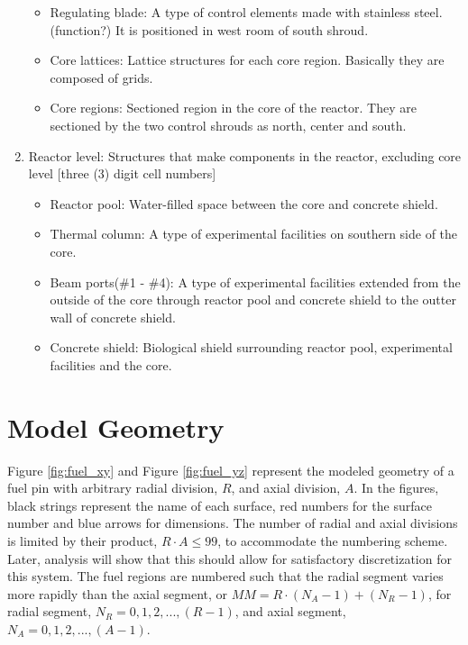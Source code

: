 \documentclass{UWNR_modeling}
\begin{document}
\begin{enumerate}
\begin{itemize}
	\item Regulating blade: A type of control elements made with stainless steel. (function?) It is positioned in west room of south shroud.
	\item Core lattices: Lattice structures for each core region. Basically they are composed of grids.
	\item Core regions: Sectioned region in the core of the reactor. They are sectioned by the two control shrouds as north, center and south.
	\end{itemize}
\item Reactor level: Structures that make components in the reactor, excluding core level [three (3) digit cell numbers]
	\begin{itemize}
	\item Reactor pool: Water-filled space between the core and concrete shield.
	\item Thermal column: A type of experimental facilities on southern side of the core.
	\item Beam ports(\#1 - \#4): A type of experimental facilities extended from the outside of the core through reactor pool and concrete shield to the outter wall of concrete shield.
	\item Concrete shield: Biological shield surrounding reactor pool, experimental facilities and the core.
\end{itemize}
\end{enumerate}

\section{Model Geometry}\label{section:geometry}
Figure \ref{fig:fuel_xy} and Figure \ref{fig:fuel_yz} represent the modeled geometry of a fuel pin with arbitrary radial division, $R$, and axial division, $A$. In the figures, black strings represent the name of each surface, red numbers for the surface number and blue arrows for dimensions.  The number of radial and axial divisions is limited by their product, $R \cdot A \leq 99$, to accommodate the numbering scheme.  Later, analysis will show that this should allow for satisfactory discretization for this system. The fuel regions are numbered such that the radial segment varies more rapidly than the axial segment, or $MM = R\cdot(N_A-1) + (N_R-1)$, for radial segment, $N_R = 0, 1, 2, ..., (R-1)$, and axial segment, $N_A = 0, 1, 2, ..., (A-1)$.
\end{document}

